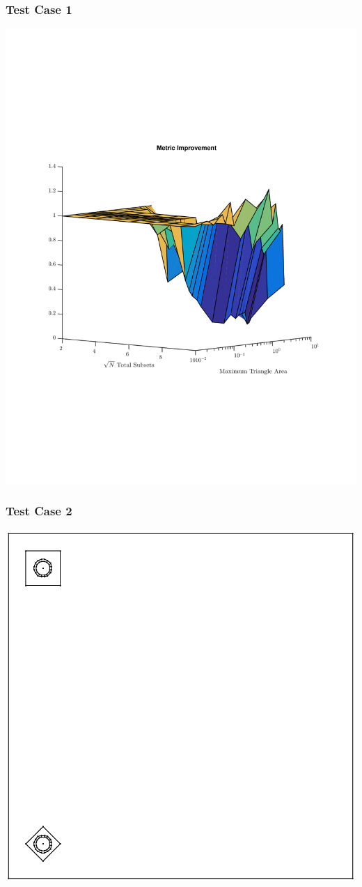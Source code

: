 \documentclass[]{beamer}
\begin{document}
\begin{frame}[t]\frametitle{Test Case 1}
\centering
\includegraphics[scale=0.47, trim = 0cm 8cm 0cm 7cm]{figures/OppDiff.pdf}
\end{frame}

\begin{frame}[t]\frametitle{Test Case 2}
\centering
\includegraphics[scale = 0.4]{figures/unbalanced_pins_same_side-eps-converted-to.pdf}
\end{frame}
\end{document}
